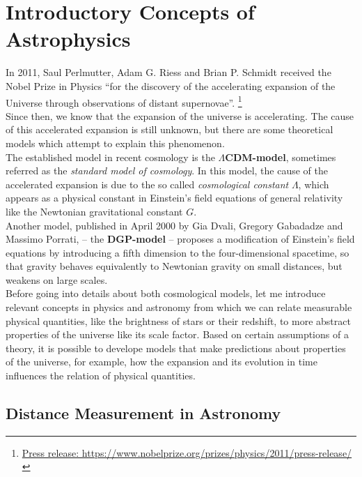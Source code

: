\chapter{Introductory Concepts of Astrophysics}
\label{chap:introductory-concepts-of-astrophysics}
\thispagestyle{empty}

In 2011, Saul Perlmutter, Adam G. Riess and Brian P. Schmidt received the Nobel Prize in Physics \enquote{for the discovery of the accelerating expansion of the Universe through observations of distant supernovae}. \footnote{\href{https://www.nobelprize.org/prizes/physics/2011/press-release/}{Press release: https://www.nobelprize.org/prizes/physics/2011/press-release/}} \\
Since then, we know that the expansion of the universe is accelerating.
The cause of this accelerated expansion is still unknown, but there are some theoretical models which attempt to explain this phenomenon. \\

\noindent The established model in recent cosmology is the \textbf{$\Lambda$CDM-model}, sometimes referred as the \textit{standard model of cosmology}.
In this model, the cause of the accelerated expansion is due to the so called \textit{cosmological constant} $\Lambda$, which appears as a physical constant in Einstein's field equations of general relativity like the Newtonian gravitational constant $G$. \\

\noindent Another model, published in April 2000 by Gia Dvali, Gregory Gabadadze and Massimo Porrati, -- the \textbf{DGP-model} -- proposes a modification of Einstein's field equations by introducing a fifth dimension to the four-dimensional spacetime, so that gravity behaves equivalently to Newtonian gravity on small distances, but weakens on large scales. \\


\noindent Before going into details about both cosmological models, let me introduce relevant concepts in physics and astronomy from which we can relate measurable physical quantities, like the brightness of stars or their redshift, to more abstract properties of the universe like its scale factor. Based on certain assumptions of a theory, it is possible to develope models that make predictions about properties of the universe, for example, how the expansion and its evolution in time influences the relation of physical quantities.



\section{Distance Measurement in Astronomy}

